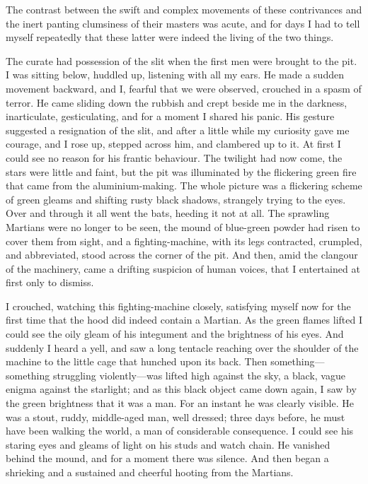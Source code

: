 The contrast between the swift and complex movements of these contrivances and the inert panting clumsiness of their masters was acute, and for days I had to tell myself repeatedly that these latter were indeed the living of the two things.

The curate had possession of the slit when the first men were brought to the pit. I was sitting below, huddled up, listening with all my ears. He made a sudden movement backward, and I, fearful that we were observed, crouched in a spasm of terror. He came sliding down the rubbish and crept beside me in the darkness, inarticulate, gesticulating, and for a moment I shared his panic. His gesture suggested a resignation of the slit, and after a little while my curiosity gave me courage, and I rose up, stepped across him, and clambered up to it. At first I could see no reason for his frantic behaviour. The twilight had now come, the stars were little and faint, but the pit was illuminated by the flickering green fire that came from the aluminium-making. The whole picture was a flickering scheme of green gleams and shifting rusty black shadows, strangely trying to the eyes. Over and through it all went the bats, heeding it not at all. The sprawling Martians were no longer to be seen, the mound of blue-green powder had risen to cover them from sight, and a fighting-machine, with its legs contracted, crumpled, and abbreviated, stood across the corner of the pit. And then, amid the clangour of the machinery, came a drifting suspicion of human voices, that I entertained at first only to dismiss.

I crouched, watching this fighting-machine closely, satisfying myself now for the first time that the hood did indeed contain a Martian. As the green flames lifted I could see the oily gleam of his integument and the brightness of his eyes. And suddenly I heard a yell, and saw a long tentacle reaching over the shoulder of the machine to the little cage that hunched upon its back. Then something—something struggling violently—was lifted high against the sky, a black, vague enigma against the starlight; and as this black object came down again, I saw by the green brightness that it was a man. For an instant he was clearly visible. He was a stout, ruddy, middle-aged man, well dressed; three days before, he must have been walking the world, a man of considerable consequence. I could see his staring eyes and gleams of light on his studs and watch chain. He vanished behind the mound, and for a moment there was silence. And then began a shrieking and a sustained and cheerful hooting from the Martians.

